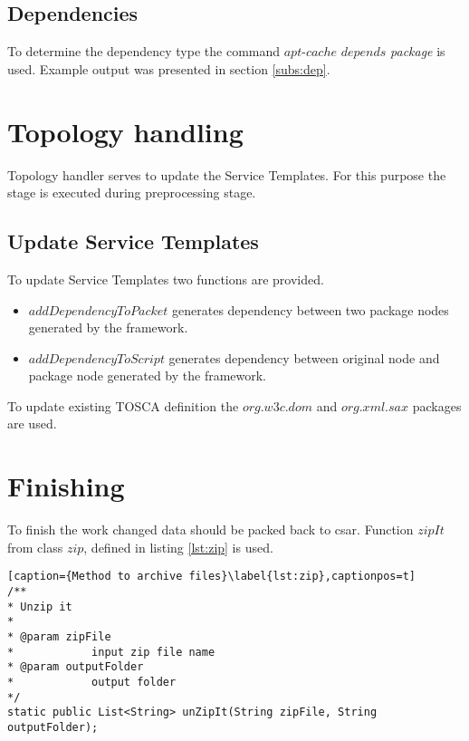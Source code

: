 \subsection*{Dependencies}
To determine the dependency type the command $apt$-$cache$ $depends$  \emph{package} is used.
Example output was presented in section \ref{subs:dep}.

\section{Topology handling}
Topology handler serves to update the Service Templates.
For this purpose the  stage is executed during preprocessing stage.

\subsection*{Update Service Templates}
To update Service Templates two functions are provided.
\begin{itemize}
	\item $addDependencyToPacket$ generates dependency between two package nodes generated by the framework.
	\item $addDependencyToScript$ generates dependency between original node and package node generated by the framework.
	 
\end{itemize} 
To update existing TOSCA definition the $org$.$w3c$.$dom$ and $org$.$xml$.$sax$ packages are used.

\section{Finishing}
To finish the work changed data should be packed back to \gls{csar}.
Function $zipIt$ from class $zip$, defined in listing \ref{lst:zip} is used.

\begin{lstlisting}[caption={Method to archive files}\label{lst:zip},captionpos=t] 
/**
* Unzip it
* 
* @param zipFile
*            input zip file name
* @param outputFolder
*            output folder
*/
static public List<String> unZipIt(String zipFile, String outputFolder);
\end{lstlisting}